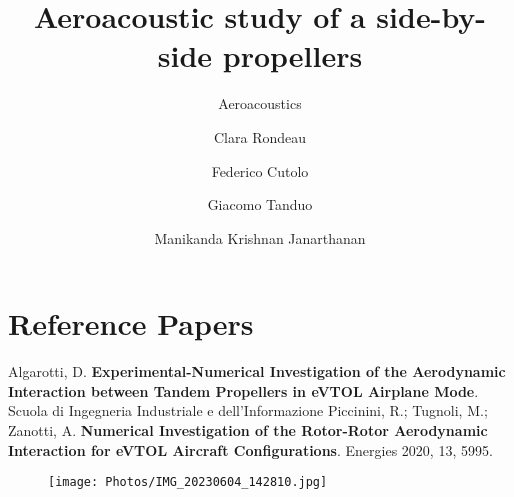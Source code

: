 \documentclass{beamer}
\title{Aeroacoustic study of a side-by-side propellers}
\subtitle{Aeroacoustics}
\author{Clara Rondeau\and Federico Cutolo \and Giacomo Tanduo \and Manikanda Krishnan Janarthanan}
\begin{document}
    \begin{frame}
        \maketitle
    \end{frame}







\section{Reference Papers}
\begin{frame}
    \cite{tesis}  Algarotti, D. \textbf{Experimental-Numerical Investigation of the Aerodynamic Interaction between Tandem Propellers in eVTOL Airplane Mode}. Scuola di Ingegneria Industriale e dell'Informazione \newline
    \newline
     \cite{paper} Piccinini, R.; Tugnoli, M.; Zanotti, A. \textbf{Numerical Investigation of the Rotor-Rotor Aerodynamic Interaction for eVTOL Aircraft Configurations}. Energies 2020, 13, 5995.

\end{frame}

\begin{frame}
    \begin{figure}[H]
    \centering
\texttt{[image: Photos/IMG\_20230604\_142810.jpg]}
\end{figure}  
\end{frame}
\end{document}
